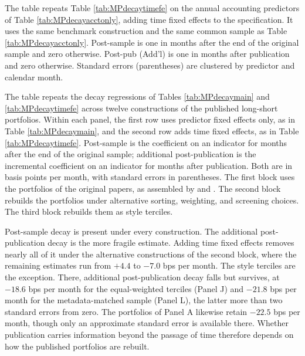 \begin{table}[H]
    \caption{Decay regressions using only annual accounting predictors, controlling for time effects}\label{tab:MPdecayacctonlytimefe}
    \small

    The table repeats Table \ref{tab:MPdecaytimefe} on the annual accounting predictors of Table \ref{tab:MPdecayacctonly}, adding time fixed effects to the specification. It uses the same benchmark construction and the same common sample as Table \ref{tab:MPdecayacctonly}. Post-sample is one in months after the end of the original sample and zero otherwise. Post-pub (Add'l) is one in months after publication and zero otherwise. Standard errors (parentheses) are clustered by predictor and calendar month.
    \vspace{2ex}

    \centering

    \setlength{\tabcolsep}{2.0ex}
    
\end{table}


\begingroup
\captionsetup{type=table}
\caption{Post-sample and post-publication decay across portfolio constructions}\label{tab:timefe-robustness}
\small

The table repeats the decay regressions of Tables \ref{tab:MPdecaymain} and \ref{tab:MPdecaytimefe} across twelve constructions of the published long-short portfolios. Within each panel, the first row uses predictor fixed effects only, as in Table \ref{tab:MPdecaymain}, and the second row adds time fixed effects, as in Table \ref{tab:MPdecaytimefe}. Post-sample is the coefficient on an indicator for months after the end of the original sample; additional post-publication is the incremental coefficient on an indicator for months after publication. Both are in basis points per month, with standard errors in parentheses. The first block uses the portfolios of the original papers, as assembled by \citet{mclean2016does} and \citet{ChenZimmermann2021}. The second block rebuilds the \citet{ChenZimmermann2021} portfolios under alternative sorting, weighting, and screening choices. The third block rebuilds them as \citet{jensen2022there} style terciles.

Post-sample decay is present under every construction. The additional post-publication decay is the more fragile estimate. Adding time fixed effects removes nearly all of it under the alternative \citet{ChenZimmermann2021} constructions of the second block, where the remaining estimates run from $+4.4$ to $-7.0$ bps per month. The \citet{jensen2022there} style terciles are the exception. There, additional post-publication decay falls but survives, at $-18.6$ bps per month for the equal-weighted terciles (Panel J) and $-21.8$ bps per month for the metadata-matched sample (Panel L), the latter more than two standard errors from zero. The \citet{mclean2016does} portfolios of Panel A likewise retain $-22.5$ bps per month, though only an approximate standard error is available there. Whether publication carries information beyond the passage of time therefore depends on how the published portfolios are rebuilt.
\vspace{2ex}

